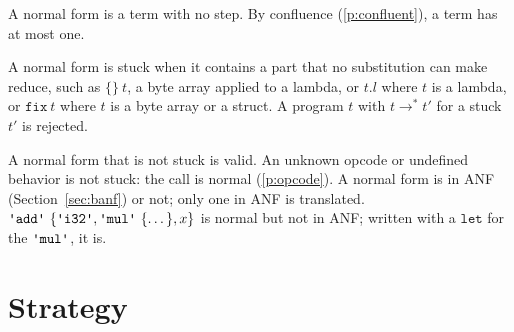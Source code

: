 \documentclass[11pt,letterpaper]{article}
\newcommand{\steps}{\mathrel{\longrightarrow^{*}}} %
\newcommand{\kw}[1]{\mathtt{#1}}
\newcommand{\str}[1]{\text{\ttfamily\textquotesingle #1\textquotesingle}}  %
\newcommand{\pref}[1]{\ref{#1}}  %
\begin{document}
\begin{points}
\item\label{p:normal} A normal form is a term with no step. By confluence (\pref{p:confluent}), a term has at most one.
\item\label{p:stuck} A normal form is stuck when it contains a part that no substitution can make
  reduce, such as $\{\}\ t$, a byte array applied to a lambda, or $t.l$ where $t$ is a lambda, or $\kw{fix}\ t$ where $t$ is a byte array or a struct. A
  program $t$ with $t \steps t'$ for a stuck $t'$ is rejected.
\item\label{p:forms} A normal form that is not stuck is valid. An unknown opcode or undefined behavior is not stuck: the call is normal (\pref{p:opcode}). A normal form is in ANF (Section~\ref{sec:banf}) or
  not; only one in ANF is translated. $\str{add}\ \{\str{i32}, \str{mul}\ \{\dots\}, x\}$
  is normal but not in ANF; written with a  $\kw{let}$ for the $\str{mul}$, it is.
\end{points}



\section{Strategy}\label{sec:strategy}
\end{document}
